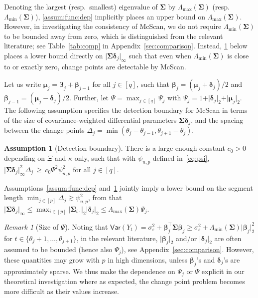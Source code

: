 \documentclass[11pt, a4paper]{article}
\newcommand{\vep}{\varepsilon}
\newcommand{\cp}{\theta}
\newcommand{\Var}[0]{\mathsf{Var}}
\theoremstyle{definition}
\theoremstyle{definition}
\theoremstyle{definition}
\theoremstyle{definition}
\theoremstyle{definition}
\newtheorem{assum}{Assumption}
\theoremstyle{remark}
\newtheorem{rem}{Remark}[section]
\theoremstyle{definition}
\theoremstyle{definition}
\theoremstyle{definition}
\begin{document}
Denoting the largest (resp.\ smallest) eigenvalue of $\bm\Sigma$ by $\Lambda_{\max}(\bm\Sigma)$ (resp.\  $\Lambda_{\min}(\bm\Sigma)$), \cref{assum:func:dep} implicitly places an upper bound on $\Lambda_{\max}(\bm\Sigma)$. However, in investigating the consistency of McScan, we do not require $\Lambda_{\min}(\bm\Sigma)$ to be bounded away from zero, which is distinguished from the relevant literature; see Table~\ref{tab:comp} in Appendix~\ref{sec:comparison}. Instead, \cref{assum:size} below places a lower bound directly on $\vert \bm\Sigma \bm\delta_j \vert_\infty$ such that even when $\Lambda_{\min}(\bm\Sigma)$ is close to or exactly zero, change points are detectable by McScan. 

Let us write $\bm\mu_j = \bm\beta_j + \bm\beta_{j - 1}$ for all $j \in [q]$, such that $\bm\beta_j = (\bm\mu_j + \bm\delta_j)/2$ and $\bm\beta_{j - 1} = (\bm\mu_j - \bm\delta_j)/2$.
Further, let $\Psi = \max_{j \in [q]} \Psi_j$ with $\Psi_j = 1 + \vert \bm\delta_j \vert_2 + \vert \bm\mu_j \vert_2$.
The following assumption specifies the detection boundary for McScan in terms of the size of covariance-weighted differential parameters $\bm\Sigma \bm\delta_j$, and the spacing between the change points $\Delta_j = \min(\cp_j - \cp_{j - 1}, \cp_{j + 1} - \cp_j)$.
\begin{assum}[Detection boundary]
	\label{assum:size} 
	There is a large enough constant $c_0 > 0$ depending on $\Xi$ and $\kappa$ only, such that with $\psi_{n, p}$ defined in~\eqref{eq:psi}, $\vert \bm\Sigma \bm\delta_j \vert_\infty^{2} \Delta_j \, \ge\, c_0 \Psi^2 \psi_{n, p}^2$ for all $j \in [q]$.
\end{assum}
Assumptions~\ref{assum:func:dep} and~\ref{assum:size} jointly imply a lower bound on the segment length
$\min_{j \in [p]} \Delta_j \gtrsim \psi_{n, p}^2$, from that $\vert \bm\Sigma \bm\delta_j \vert_{\infty} \le \max_{i \in [p]} \vert \bm\Sigma_{i \cdot}\vert_2 \vert\bm\delta_j\vert_2 \le \Lambda_{\max}(\bm\Sigma) \Psi_j$. 

\begin{rem}[Size of $\Psi$]
\label{rem:Psi}
Noting that $\Var(Y_t) = \sigma_\vep^2 + \bm\beta_j^\top \bm\Sigma \bm\beta_j \ge \sigma_\vep^2 + \Lambda_{\min}(\bm\Sigma) \vert \bm\beta_j \vert_2^2$ for $t \in \{\cp_j + 1, \ldots, \cp_{j + 1}\}$,
in the relevant literature, $\vert \bm\beta_j \vert_2$ and/or $\vert \bm\delta_j \vert_2$ are often assumed to be bounded (hence also $\Psi_j$), see Appendix~\ref{sec:comparison}. 
However, these quantities may grow with $p$ in high dimensions, unless $\bm\beta_j$'s and $\bm\delta_j$'s are approximately sparse.
	We thus make the dependence on $\Psi_j$ or $\Psi$ explicit in our theoretical investigation where as expected, the change point problem becomes more difficult as their values increase.
\end{rem}
\end{document}
